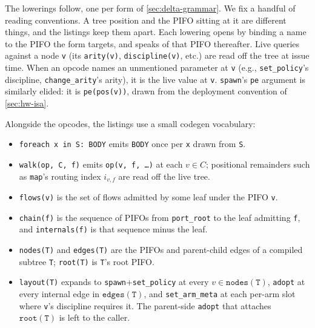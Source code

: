 The lowerings follow, one per form of \cref{sec:delta-grammar}.
We fix a handful of reading conventions.
A tree position and the PIFO sitting at it are different things, and the listings keep them apart.
Each lowering opens by binding a name to the PIFO the form targets, and speaks of that PIFO thereafter.
Live queries against a node \texttt{v} (its \texttt{arity(v)}, \texttt{discipline(v)}, etc.) are read off the tree at issue time.
When an opcode names an unmentioned parameter at \texttt{v} (e.g., \texttt{set\_policy}'s discipline, \texttt{change\_arity}'s arity), it is the live value at \texttt{v}.
\texttt{spawn}'s \texttt{pe} argument is similarly elided: it is \texttt{pe(pos(v))}, drawn from the deployment convention of \cref{sec:hw-isa}.

Alongside the opcodes, the listings use a small codegen vocabulary:
\begin{itemize}
\item \texttt{foreach x in S: BODY} emits \texttt{BODY} once per \texttt{x} drawn from \texttt{S}.
\item \texttt{walk(op, C, f)} emits \texttt{op(v, f, \ldots)} at each \(v \in C\); positional remainders such as \texttt{map}'s routing index \(i_{v,f}\) are read off the live tree.
\item \texttt{flows(v)} is the set of flows admitted by some leaf under the PIFO \texttt{v}.
\item \texttt{chain(f)} is the sequence of PIFOs from \texttt{port\_root} to the leaf admitting \texttt{f}, and \texttt{internals(f)} is that sequence minus the leaf.
\item \texttt{nodes(T)} and \texttt{edges(T)} are the PIFOs and parent-child edges of a compiled subtree \texttt{T}; \texttt{root(T)} is \texttt{T}'s root PIFO.
\item \texttt{layout(T)} expands to \texttt{spawn}+\texttt{set\_policy} at every \(v \in \mathtt{nodes(T)}\), \texttt{adopt} at every internal edge in \(\mathtt{edges(T)}\), and \texttt{set\_arm\_meta} at each per-arm slot where \texttt{v}'s discipline requires it.
The parent-side \texttt{adopt} that attaches \(\mathtt{root(T)}\) is left to the caller.
\end{itemize}

